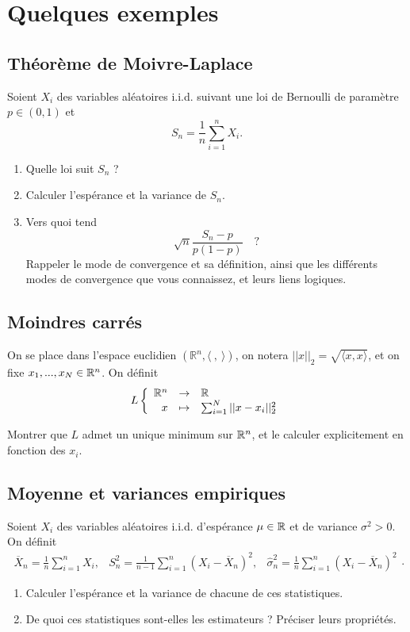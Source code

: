 \section{Quelques exemples}

\subsection{Théorème de Moivre-Laplace}

Soient $X_i$ des variables aléatoires i.i.d. suivant une loi de Bernoulli de paramètre $p\in (0,1)$ et 
\[S_n=\frac{1}{n}\sum_{i=1}^n X_i.\]

\begin{enumerate}
\item Quelle loi suit $S_n$ ?
\item Calculer l'espérance et la variance de $S_n$.
\item Vers quoi tend \[\sqrt{n}\frac{S_n - p}{p(1-p)}\quad \text{?}\]
Rappeler le mode de convergence et sa définition, ainsi que les différents modes de convergence que vous connaissez, et leurs liens logiques.
\end{enumerate}

\subsection{Moindres carrés}

On se place dans l'espace euclidien $(\mathbb R^n, \langle \ , \ \rangle) $, on notera $||x||_2 = \sqrt{\langle x,x\rangle}$, et on fixe $x_1,...,x_N \in \mathbb R^n$. On définit 
\[L\left\{ \begin{array}{rcl} \mathbb R^n & \rightarrow & \mathbb R \\ x &  \mapsto & \sum_{i=1}^N ||x-x_i||_2^2 \end{array}\right.\]

Montrer que $L$ admet un unique minimum sur $\mathbb R^n$, et le calculer explicitement en fonction des $x_i$.

\subsection{Moyenne et variances empiriques}
Soient $X_i$ des variables aléatoires i.i.d. d'espérance $\mu\in\mathbb R$ et de variance $\sigma^2>0$. On définit 
\[\begin{array}{rcl} \overline X_n = \frac{1}{n}\sum_{i=1}^n X_i, & S^2_n = \frac{1}{n-1}\sum_{i=1}^n (X_i -\overline{X}_n)^2, & \hat{\sigma}^2_n = \frac{1}{n}\sum_{i=1}^n (X_i -\overline{X}_n)^2  \end{array}.\]

\begin{enumerate}
\item Calculer l'espérance et la variance de chacune de ces statistiques.
\item De quoi ces statistiques sont-elles les estimateurs ? Préciser leurs propriétés.
\end{enumerate}

